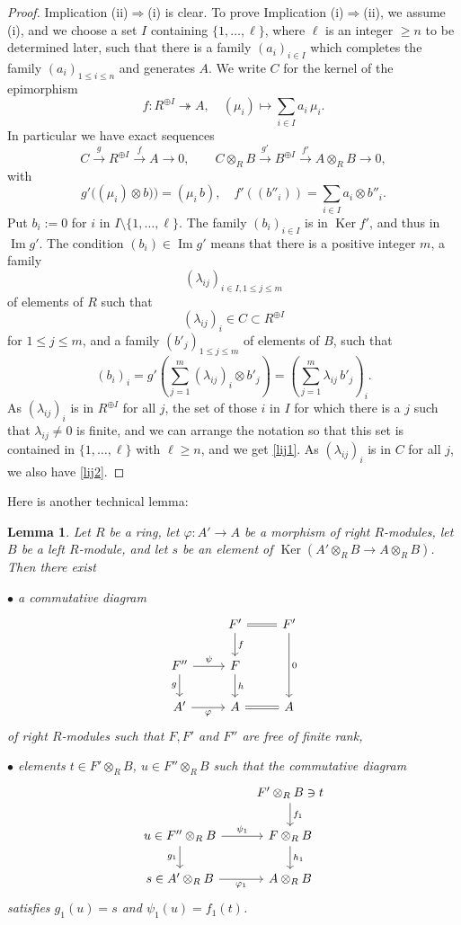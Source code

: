 \documentclass[12pt]{article}
\newtheorem{lem}[thm]{Lemma}
\theoremstyle{remark}
\theoremstyle{definition}
\newcommand{\bu}{\bullet}
\newcommand{\nn}{\noindent}
\newcommand{\pp}{\varphi}
\newcommand{\epi}{\twoheadrightarrow}
\newcommand{\then}{\Rightarrow}
\newcommand{\xr}{\xrightarrow}
\DeclareMathOperator{\Ima}{Im}
\DeclareMathOperator{\Ker}{Ker}
\begin{document}
\begin{proof} 
Implication (ii)$\then$(i) is clear. To prove Implication (i)$\then$(ii), we assume (i), and we choose a set $I$ containing $\{1,\dots,\ell\}$, where $\ell$ is an integer $\ge n$ to be determined later, such that there is a family $(a_i)_{i\in I}$ which completes the family $(a_i)_{1\le i\le n}$ and generates $A$. We write $C$ for the kernel of the epimorphism 
$$
f:R^{\oplus I}\epi A,\quad(\mu_i)\mapsto\sum_{i\in I}a_i\,\mu_i.
$$ 
In particular we have exact sequences 
$$
C\xr gR^{\oplus I}\xr fA\to0,\qquad C\otimes_RB\xr{g'}B^{\oplus I}\xr{f'}A\otimes_RB\to0,
$$ 
with 
$$
g'\big((\mu_i)\otimes b)\big)=(\mu_i\,b),\quad f'((b''_i))=\sum_{i\in I}a_i\otimes b''_i.
$$
Put $b_i:=0$ for $i$ in $I\setminus\{1,\dots,\ell\}$. The family $(b_i)_{i\in I}$ is in $\Ker f'$, and thus in $\Ima g'$. The condition $(b_i)\in\Ima g'$ means that there is a positive integer $m$, a family 
$$
(\lambda_{ij})_{i\in I,1\le j\le m}
$$ 
of elements of $R$ such that 
$$
(\lambda_{ij})_i\in C\subset R^{\oplus I}
$$ 
for $1\le j\le m$, and a family $(b'_j)_{1\le j\le m}$ of elements of $B$, such that 
$$
(b_i)_i=g'
\left(\sum_{j=1}^m(\lambda_{ij})_i\otimes b'_j\right)=
\left(\sum_{j=1}^m\lambda_{ij}\,b'_j\right)_i.
$$ 
As $(\lambda_{ij})_i$ is in $R^{\oplus I}$ for all $j$, the set of those $i$ in $I$ for which there is a $j$ such that $\lambda_{ij}\neq0$ is finite, and we can arrange the notation so that this set is contained in $\{1,\dots,\ell\}$ with $\ell\ge n$, and we get \eqref{lij1}. As $(\lambda_{ij})_i$ is in $C$ for all $j$, we also have \eqref{lij2}. 
\end{proof} 

Here is another technical lemma:

\begin{lem}\label{techlem2}
Let $R$ be a ring, let $\pp:A'\to A$ be a morphism of right $R$-modules, let $B$ be a left $R$-module, and let $s$ be an element of $\Ker(A'\otimes_RB\to A\otimes_RB)$. Then there exist 

\nn$\bu$ a commutative diagram 
$$
\begin{tikzcd}
{}&F'\ar{d}{f}\ar[equal]{r}&F'\ar{dd}{0}\\ 
F''\ar{r}{\psi}\ar{d}[swap]{g}&F\ar{d}{h}\\ 
A'\ar{r}[swap]{\pp}&A\ar[equal]{r}&A
\end{tikzcd}
$$  
of right $R$-modules such that $F,F'$ and $F''$ are free of finite rank,  

\nn$\bu$ elements $t\in F'\otimes_RB$, $u\in F''\otimes_RB$ such that the commutative diagram 
$$
\begin{tikzcd}
{}&F'\otimes_RB\ni t\ar{d}{f_1}\\ 
u\in F''\otimes_RB\ar{r}{\psi_1}\ar{d}[swap]{g_1}&F\otimes_RB\ar{d}{h_1}\\ 
s\in A'\otimes_RB\ar{r}[swap]{\pp_1}&A\otimes_RB
\end{tikzcd}
$$  
satisfies $g_1(u)=s$ and $\psi_1(u)=f_1(t)$. 
\end{lem} 
\end{document}

